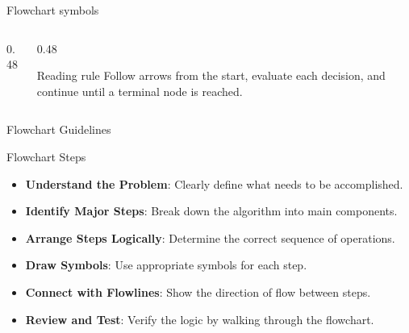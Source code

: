 \documentclass[aspectratio=169]{beamer}
\begin{document}
\begin{frame}{Flowchart symbols}
  \small
  \begin{columns}[T]
    \begin{column}{0.48\textwidth}
      \begin{center}
      \end{center}
    \end{column}
    \begin{column}{0.48\textwidth}
      \begin{center}
      \end{center}
      \vspace{0.35em}
      \begin{alertblock}{Reading rule}
        Follow arrows from the start, evaluate each decision, and continue until
        a terminal node is reached.
      \end{alertblock}
    \end{column}
  \end{columns}
\end{frame}




\begin{frame}{Flowchart Guidelines}

\begin{block}{Flowchart Steps}
  \begin{itemize}
          \item {\bf Understand the Problem}: Clearly define what needs to be accomplished.
\item {\bf Identify Major Steps}: Break down the algorithm into main components.
\item {\bf Arrange Steps Logically}: Determine the correct sequence of operations.
\item {\bf Draw Symbols}: Use appropriate symbols for each step.
\item {\bf Connect with Flowlines}: Show the direction of flow between steps.
\item {\bf Review and Test}: Verify the logic by walking through the flowchart.
      \end{itemize}
\end{block}
\end{frame}
\end{document}
